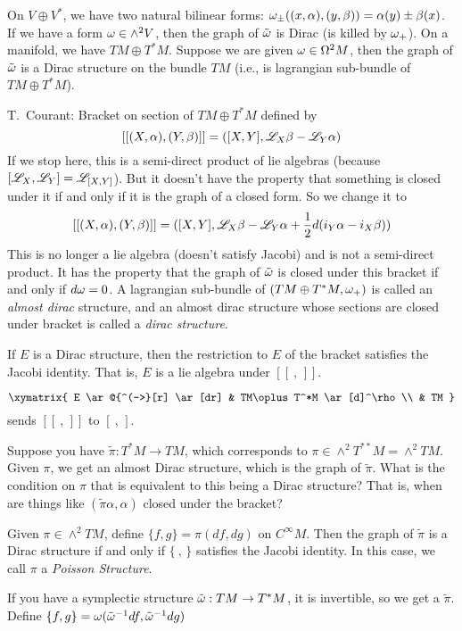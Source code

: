  \vspace{2mm}

 On $V\oplus V^*$, we have two natural bilinear forms:
 $\omega_{\pm}((x,\alpha),(y,\beta)) = \alpha(y)\pm \beta(x)$.  If we
 have a form $\omega\in \wedge^2 V$, then the graph of $\tilde {\omega}$ is
 Dirac (is killed by $\omega_+$).  On a manifold, we have $TM\oplus T^*M$.  Suppose we
 are given $\omega\in \Omega^2M$, then the graph of $\tilde {\omega}$ is a
 Dirac structure on the bundle $TM$ (i.e., is lagrangian
 sub-bundle of $TM\oplus T^*M$).

 T.~Courant: Bracket on section of $TM\oplus T^*M$ defined by
 \[
    [[(X,\alpha),(Y,\beta)]] = ([X,Y],\mathscr{L}_X\beta-\mathscr{L}_Y\alpha)
 \]
 If we stop here, this is a semi-direct product of lie algebras
 (because $[\mathscr{L}_X,\mathscr{L}_Y] = \mathscr{L}_{[X,Y]}$).  But it doesn't have the
 property that something is closed under it if and only if it is
 the graph of a closed form.  So we change it to
 \[
    [[(X,\alpha),(Y,\beta)]] = ([X,Y],\mathscr{L}_X\beta-\mathscr{L}_Y\alpha+\frac{1}{2}d(i_Y\alpha-i_X\beta))
 \]
 This is no longer a lie algebra (doesn't satisfy Jacobi) and is not a semi-direct
 product. It has the property that the graph of $\tilde {\omega}$ is
 closed under this bracket if and only if $d\omega=0$.  A lagrangian
 sub-bundle of $(TM\oplus T^*M,\omega_+)$ is called an \emph{almost
 dirac} structure, and an almost dirac structure whose sections
 are closed under bracket is called a \emph{dirac structure}.
 \begin{theorem}
   If $E$ is a Dirac structure, then the restriction to $E$ of the
   bracket satisfies the Jacobi identity.  That is, $E$ is a lie
   algebra under $[[\ ,\, ]]$.
 \end{theorem}

 \[\xymatrix{
  E \ar@{^(->}[r] \ar[dr] & TM\oplus T^*M \ar[d]^\rho\\ & TM
 }\]
 sends $[[\ ,\, ]]$ to $[\ ,\,]$.

 Suppose you have $\tilde \pi:T^*M\to TM$, which corresponds to
 $\pi\in \wedge^2 T^{**}M = \wedge^2 TM$.  Given $\pi$, we get an
 almost Dirac structure, which is the graph of $\tilde \pi$.  What
 is the condition on $\pi$ that is equivalent to this being a
 Dirac structure?  That is, when are things like $(\tilde \pi
 \alpha,\alpha)$ closed under the bracket?

 \begin{theorem}
   Given $\pi\in \wedge^2 TM$, define $\{f,g\} = \pi(df,dg)$ on
   $C^\infty M$.  Then the graph of $\tilde \pi$ is a Dirac
   structure if and only if $\{\ ,\, \}$ satisfies the Jacobi
   identity.  In this case, we call $\pi$ a \emph{Poisson
   Structure}.
 \end{theorem}

 If you have a symplectic structure $\tilde{\omega}:TM\to T^*M$, it is
 invertible, so we get a $\tilde \pi$.  Define $\{f,g\} =
 \omega(\tilde{\omega}^{-1} df,\tilde{\omega}^{-1}dg)$
